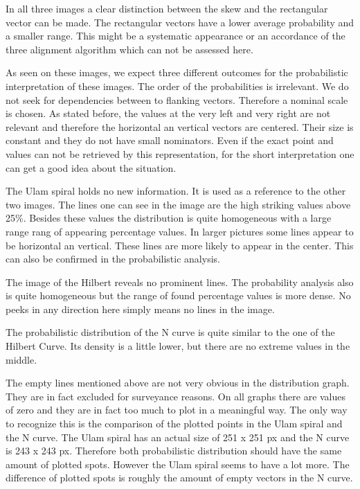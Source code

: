 In all three images a clear distinction between the skew and the rectangular vector can be made. The rectangular vectors have a lower average probability and a smaller range. This might be a systematic appearance or an accordance of the three alignment algorithm which can not be assessed here.

As seen on these images, we expect three different outcomes for the probabilistic interpretation of these images. The order of the probabilities is irrelevant. We do not seek for dependencies between to flanking vectors. Therefore a nominal scale is chosen. As stated before, the values at the very left and very right are not relevant and therefore the horizontal an vertical vectors are centered. Their size is constant and they do not have small nominators. Even if the exact point and values can not be retrieved by this representation, for the short interpretation one can get a good idea about the situation.

The Ulam spiral holds no new information. It is used as a reference to the other two images. The lines one can see in the image are the high striking values above 25\%. Besides these values the distribution is quite homogeneous with a large range rang of appearing percentage values. In larger pictures some lines appear to be horizontal an vertical. These lines are more likely to appear in the center. This can also be confirmed in the probabilistic analysis.

The image of the Hilbert reveals no prominent lines. The probability analysis also is quite homogeneous but the range of found percentage values is more dense. No peeks in any direction here simply means no lines in the image.

The probabilistic distribution of the N curve is quite similar to the one of the Hilbert Curve. Its density is a little lower, but there are no extreme values in the middle.

The empty lines mentioned above are not very obvious in the distribution graph. They are in fact excluded for surveyance reasons. On all graphs there are values of zero and they are in fact too much to plot in a meaningful way.
The only way to recognize this is the comparison of the plotted points in the Ulam spiral and the N curve. The Ulam spiral has an actual size of 251 x 251 px and the N curve is 243 x 243 px. Therefore both probabilistic distribution should have the same amount of plotted spots. However the Ulam spiral seems to have a lot more. The difference of plotted spots is roughly the amount of empty vectors in the N curve.

